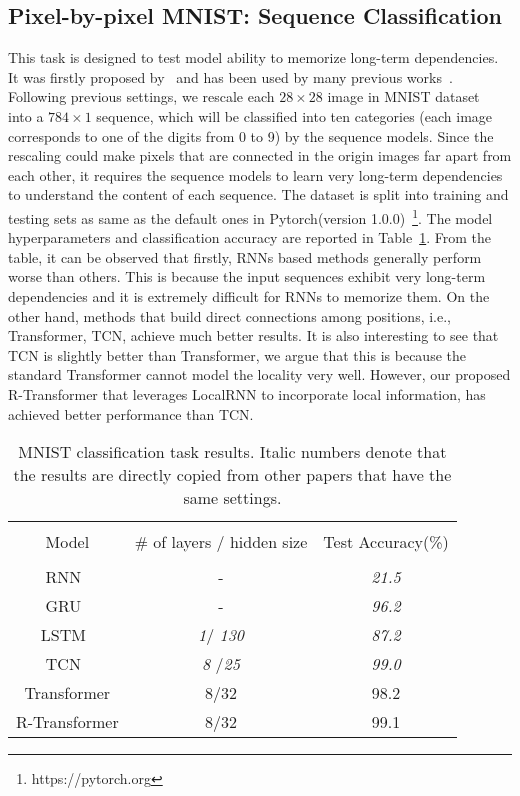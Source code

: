 \documentclass{article} \usepackage{iclr2019_conference,times}
\begin{document}
\subsection{Pixel-by-pixel MNIST: Sequence Classification}

This task is designed to test model ability to memorize long-term dependencies. It was firstly proposed by~\citet{le2015simple} and has been used by many previous works~\citep{wisdom2016full,chang2017dilated,zhang2016architectural,krueger2016zoneout}. Following previous settings, we rescale each $28 \times 28$ image in MNIST dataset~\citet{lecun1998gradient} into a $784 \times 1$ sequence, which will be classified into ten categories (each image corresponds to one of the digits from 0 to 9) by the sequence models. Since the rescaling could make pixels that are connected in the origin images far apart from each other, it requires the sequence models to learn very long-term dependencies to understand the content of each sequence. The dataset is split into training and testing sets as same as the default ones in Pytorch(version 1.0.0)~\footnote{https://pytorch.org}. The model hyperparameters and classification accuracy are reported in Table~\ref{table:mnist}. From the table, it can be observed that firstly, RNNs based methods generally perform worse than others. This is because the input sequences exhibit very long-term dependencies and it is extremely difficult for RNNs to memorize them. On the other hand, methods that build direct connections among positions, i.e., Transformer, TCN, achieve much better results. It is also interesting to see that TCN is slightly better than Transformer, we argue that this is because the standard Transformer cannot model the locality very well. However, our proposed R-Transformer that leverages LocalRNN to incorporate local information, has achieved better performance than TCN. 


\begin{table}
\begin{center}	
		\caption{MNIST classification task results. Italic numbers denote that the results are directly copied from other papers that have the same settings.}
		\vspace{4mm}
		\label{table:mnist}
\begin{tabular}{ccc}
			\hline \\[-0.9ex]
			Model &  \# of layers / hidden size & Test Accuracy(\%)\\ [0.9ex]	
			\hline			\\[-0.9ex]
			RNN~\citep{bai2018empirical} &  -   &  {\it 21.5} \\ 	[0.5ex]		
			GRU~\citep{bai2018empirical} & - &  {\it 96.2}  \\	[0.5ex]		
			LSTM~\citep{bai2018empirical} &  {\it 1}/ {\it 130} & {\it 87.2} \\[0.5ex]
			TCN~\citep{bai2018empirical} &  {\it 8} /{\it 25} &  {\it 99.0} \\[0.5ex]
			Transformer &  8/32   & 98.2\\[0.5ex]
			R-Transformer &  8/32 & 99.1 \\[0.6ex]
			\hline   
		\end{tabular}
	\end{center}
\end{table}
\end{document}
